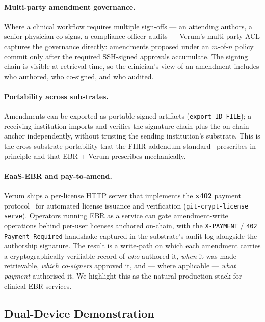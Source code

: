 \documentclass[runningheads]{llncs}
\begin{document}
\paragraph{Multi-party amendment governance.}
Where a clinical workflow requires multiple sign-offs --- an attending
authors, a senior physician co-signs, a compliance officer audits ---
Verum's multi-party ACL captures the governance directly: amendments
proposed under an $m$-of-$n$ policy commit only after the required
SSH-signed approvals accumulate. The signing chain is visible at retrieval
time, so the clinician's view of an amendment includes who authored, who
co-signed, and who audited.

\paragraph{Portability across substrates.}
Amendments can be exported as portable signed artifacts
(\texttt{export ID FILE}); a receiving institution imports and verifies
the signature chain plus the on-chain anchor independently, without
trusting the sending institution's substrate. This is the
cross-substrate portability that the FHIR addendum
standard~\cite{fhir2023,addendum2018} prescribes in principle and that
EBR + Verum prescribes mechanically.

\paragraph{EaaS-EBR and pay-to-amend.}
Verum ships a per-license HTTP server that implements the \textbf{x402}
payment protocol~\cite{x402spec} for automated license issuance and
verification (\texttt{git-crypt-license serve}). Operators running EBR
as a service can gate amendment-write operations behind per-user
licenses anchored on-chain, with the \texttt{X-PAYMENT} /
\texttt{402 Payment Required} handshake captured in the substrate's audit
log alongside the authorship signature. The result is a write-path on
which each amendment carries a cryptographically-verifiable record of
\emph{who} authored it, \emph{when} it was made retrievable, \emph{which
co-signers} approved it, and --- where applicable --- \emph{what
payment} authorised it. We highlight this as the natural production
stack for clinical EBR services.

\subsection{Dual-Device Demonstration}
\label{sec:dual-device-demo}
\end{document}

